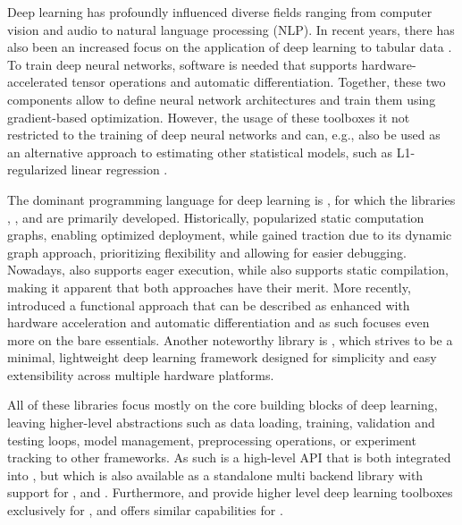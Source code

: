 \documentclass[article, nojss]{jss}
\theoremstyle{definition}
\begin{document}
Deep learning has profoundly influenced diverse fields ranging from computer vision and audio to natural language processing (NLP).
In recent years, there has also been an increased focus on the application of deep learning to tabular data \citep{borisov2022deep}.
To train deep neural networks, software is needed that supports hardware-accelerated tensor operations and automatic differentiation.
Together, these two components allow to define neural network architectures and train them using gradient-based optimization.
However, the usage of these toolboxes it not restricted to the training of deep neural networks and can, e.g., also be used as an alternative approach to estimating other statistical models, such as L1-regularized linear regression \citep{kolb2025deep}.

The dominant programming language for deep learning is , for which the libraries  \citep{abadi2016tensorflow},  \citep{paszke2019pytorch}, and  \citep{bradbury2018jax} are primarily developed.
Historically,  popularized static computation graphs, enabling optimized deployment, while  gained traction due to its dynamic graph approach, prioritizing flexibility and allowing for easier debugging.
Nowadays,  also supports eager execution, while  also supports static compilation, making it apparent that both approaches have their merit.
More recently,  introduced a functional approach that can be described as  \citep{harris2020array} enhanced with hardware acceleration and automatic differentiation \citep{bradbury2018jax} and as such focuses even more on the bare essentials.
Another noteworthy library is  \citep{tinygrad}, which strives to be a minimal, lightweight deep learning framework designed for simplicity and easy extensibility across multiple hardware platforms.

All of these libraries focus mostly on the core building blocks of deep learning, leaving higher-level abstractions such as data loading, training, validation and testing loops, model management, preprocessing operations, or experiment tracking to other frameworks. 
As such  \citep{chollet2018keras} is a high-level API that is both integrated into , but which is also available as a standalone multi backend library with support for ,  and . Furthermore,  \citep{falcon2019pytorch} and  provide higher level deep learning toolboxes exclusively for , and  \citep{trax} offers similar capabilities for .
\end{document}
